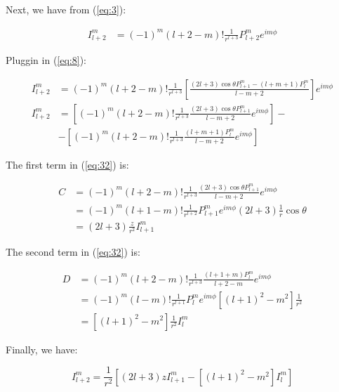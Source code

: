 \documentclass{article}
\begin{document}
Next, we have from (\ref{eq:3}):

\begin{equation}
  \begin{split}
    I^m_{l+2} & = (-1)^m (l+2-m)! \frac{1}{r^{l+3}} P^m_{l+2} e^{i m \phi}
  \end{split}
\end{equation}

Pluggin in (\ref{eq:8}):

\begin{equation}
  \begin{split} \label{eq:32}
    I^m_{l+2} & = (-1)^m (l+2-m)! \frac{1}{r^{l+3}} \left[ \frac{(2l+3)\cos{\theta}P^m_{l+1} - (l+m+1)P^m_{l}}{l-m+2} \right] e^{i m \phi} \\
    I^m_{l+2} & = \left[ (-1)^m (l+2-m)! \frac{1}{r^{l+3}} \frac{(2l+3)\cos{\theta}P^m_{l+1}}{l-m+2} e^{i m \phi} \right] - \\
    & - \left[ (-1)^m (l+2-m)! \frac{1}{r^{l+3}} \frac{(l+m+1)P^m_l}{l-m+2} e^{i m \phi}\right]
  \end{split}
\end{equation}

The first term in (\ref{eq:32}) is:

\begin{equation}
  \begin{split}
    C & = (-1)^m (l+2-m)! \frac{1}{r^{l+3}} \frac{(2l+3)\cos{\theta}P^m_{l+1}}{l-m+2} e^{i m \phi} \\
    & = (-1)^m (l+1-m)! \frac{1}{r^{l+2}} P^m_{l+1} e^{im\phi} (2l+3) \frac{1}{r} \cos{\theta} \\
    & = (2l+3) \frac{z}{r^2} I^m_{l+1}
  \end{split}
\end{equation}

The second term in (\ref{eq:32}) is:

\begin{equation}
  \begin{split}
    D & = (-1)^m (l+2-m)! \frac{1}{r^{l+3}} \frac{(l+1+m)P^m_l}{l+2-m} e^{i m \phi} \\
    & = (-1)^m (l-m)! \frac{1}{r^{l+1}} P^m_l e^{i m \phi} \left[(l+1)^2-m^2\right] \frac{1}{r^2}  \\
    & = \left[(l+1)^2-m^2\right] \frac{1}{r^2} I^m_l
  \end{split}
\end{equation}

Finally, we have:

\begin{equation}
I^m_{l+2} = \frac{1}{r^2} \left[ (2l+3) z I^m_{l+1} - \left[(l+1)^2-m^2\right] I^m_l \right]
\end{equation}
\end{document}
